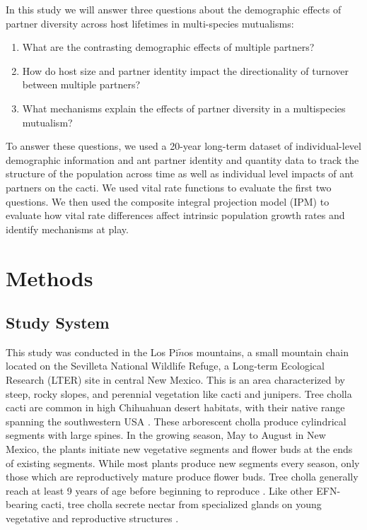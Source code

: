 \documentclass[11pt]{article}\usepackage[sc]{mathpazo} %
\begin{document}
  In this study we will answer three questions about the demographic effects of partner diversity across host lifetimes in multi-species mutualisms:
  \begin{enumerate}	
    \item{What are the contrasting demographic effects of multiple partners?}	
    \item{How do host size and partner identity impact the directionality of turnover between multiple           partners?}	
    \item{What mechanisms explain the effects of partner diversity in a multispecies mutualism?}
    \end{enumerate}
    To answer these questions, we used a 20-year long-term dataset of individual-level demographic information and ant partner identity and quantity data to track the structure of the population across time as well as individual level impacts of ant partners on the cacti.
We used vital rate functions to evaluate the first two questions. 
We then used the composite integral projection model (IPM) to evaluate how vital rate differences affect intrinsic population growth rates and identify mechanisms at play. 
    
  \section*{Methods}
  \subsection*{Study System}
  
  This study was conducted in the Los Pi$\tilde{n}$os mountains, a small mountain chain located on the Sevilleta National Wildlife Refuge, a Long-term Ecological Research (LTER) site in central New Mexico.
This is an area characterized by steep, rocky slopes, and perennial vegetation like cacti and junipers. 
Tree cholla cacti are common in high Chihuahuan desert habitats, with their native range spanning the southwestern USA \cite{Benson1982}. 
These arborescent cholla produce cylindrical segments with large spines. 
In the growing season, May to August in New Mexico, the plants initiate new vegetative segments and flower buds at the ends of existing segments. 
While most plants produce new segments every season, only those which are reproductively mature produce flower buds. 
Tree cholla generally reach at least 9 years of age before beginning to reproduce \cite{Ohm2014}.
Like other EFN-bearing cacti, tree cholla secrete nectar from specialized glands on young vegetative and reproductive structures \cite{Ness2006,Oliveira1999}.
\end{document}
